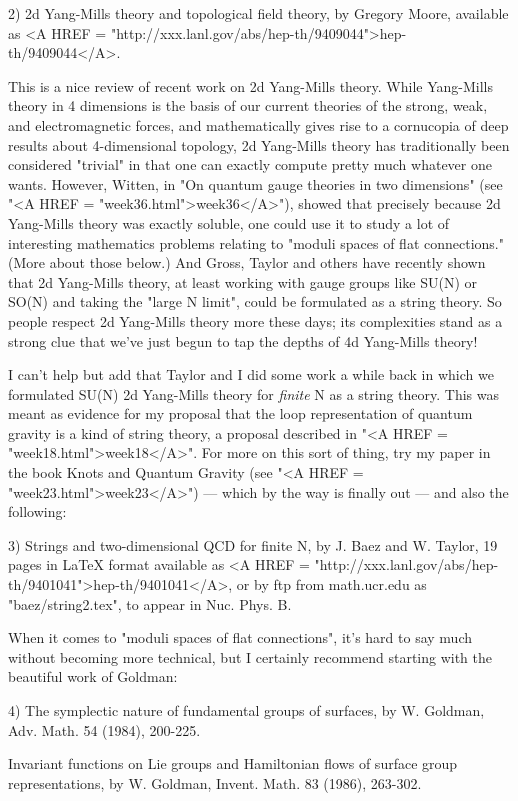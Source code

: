 2) 2d Yang-Mills theory and topological field theory, by Gregory Moore,
available as <A HREF = "http://xxx.lanl.gov/abs/hep-th/9409044">hep-th/9409044</A>.  

This is a nice review of recent work on 2d Yang-Mills theory.  While
Yang-Mills theory in 4 dimensions is the basis of our current theories
of the strong, weak, and electromagnetic forces, and mathematically
gives rise to a cornucopia of deep results about 4-dimensional topology,
2d Yang-Mills theory has traditionally been considered "trivial" in that
one can exactly compute pretty much whatever one wants.  However,
Witten, in "On quantum gauge theories in two dimensions" (see "<A HREF = "week36.html">week36</A>"),
showed that precisely because 2d Yang-Mills theory was exactly soluble,
one could use it to study a lot of interesting mathematics problems
relating to "moduli spaces of flat connections."  (More about those
below.)  And Gross, Taylor and others have recently shown that 2d
Yang-Mills theory, at least working with gauge groups like SU(N) or
SO(N) and taking the "large N limit", could be formulated as a string
theory.  So people respect 2d Yang-Mills theory more these days; its
complexities stand as a strong clue that we've just begun to tap the
depths of 4d Yang-Mills theory!

I can't help but add that Taylor and I did some work a while back in
which we formulated SU(N) 2d Yang-Mills theory for \emph{finite} N as a
string theory.  This was meant as evidence for my proposal that the loop
representation of quantum gravity is a kind of string theory, a
proposal described in "<A HREF = "week18.html">week18</A>".  For more on this sort of thing, try
my paper in the book Knots and Quantum Gravity (see "<A HREF = "week23.html">week23</A>") --- which
by the way is finally out --- and also the following:

3) Strings and two-dimensional QCD for finite N, by J. Baez and W.
Taylor, 19 pages in LaTeX format available as <A HREF = "http://xxx.lanl.gov/abs/hep-th/9401041">hep-th/9401041</A>, or by ftp
from math.ucr.edu as "baez/string2.tex", to appear in Nuc. Phys. B.


When it comes to "moduli spaces of flat connections", it's hard to say
much without becoming more technical, but I certainly recommend starting
with the beautiful work of Goldman:

4) The symplectic nature of fundamental groups of surfaces, by W.
Goldman, Adv. Math. 54 (1984), 200-225.

Invariant functions on Lie groups and Hamiltonian flows of surface
group representations, by W. Goldman, Invent. Math. 83 (1986), 263-302.

